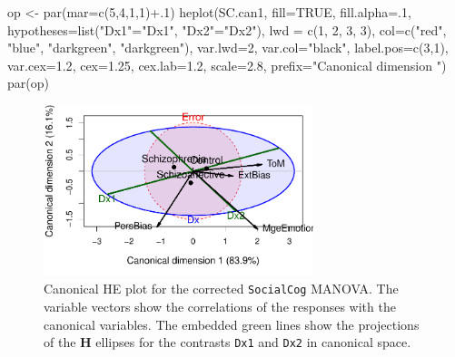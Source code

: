 \documentclass[
  letterpaper,
  10pt,
  krantz2]{krantz}
\makeatletter
\newenvironment{Shaded}{\begin{snugshade}}{\end{snugshade}}
\newcommand{\AttributeTok}[1]{\textcolor[rgb]{0.40,0.45,0.13}{#1}}
\newcommand{\ConstantTok}[1]{\textcolor[rgb]{0.56,0.35,0.01}{#1}}
\newcommand{\DecValTok}[1]{\textcolor[rgb]{0.68,0.00,0.00}{#1}}
\newcommand{\FloatTok}[1]{\textcolor[rgb]{0.68,0.00,0.00}{#1}}
\newcommand{\FunctionTok}[1]{\textcolor[rgb]{0.28,0.35,0.67}{#1}}
\newcommand{\NormalTok}[1]{\textcolor[rgb]{0.00,0.23,0.31}{#1}}
\newcommand{\OtherTok}[1]{\textcolor[rgb]{0.00,0.23,0.31}{#1}}
\newcommand{\SpecialCharTok}[1]{\textcolor[rgb]{0.37,0.37,0.37}{#1}}
\newcommand{\StringTok}[1]{\textcolor[rgb]{0.13,0.47,0.30}{#1}}
\newenvironment{kframe}{%
  \medskip{}
  \setlength{\fboxsep}{.8em}
  \def\at@end@of@kframe{}%
  \ifinner\ifhmode%
  \def\at@end@of@kframe{\end{minipage}}%
  \begin{minipage}{\columnwidth}%
  \fi\fi%
  \def\FrameCommand##1{\hskip\@totalleftmargin \hskip-\fboxsep
  \colorbox{shadecolor}{##1}\hskip-\fboxsep
      \hskip-\linewidth \hskip-\@totalleftmargin \hskip\columnwidth}%
  \MakeFramed {\advance\hsize-\width
    \@totalleftmargin\z@ \linewidth\hsize
    \@setminipage}}%
{\par\unskip\endMakeFramed%
  \at@end@of@kframe}
\renewenvironment{Shaded}{\begin{kframe}}{\end{kframe}}
\makeatother
\begin{document}
\begin{Shaded}
\begin{Highlighting}[]
\NormalTok{op }\OtherTok{\textless{}{-}} \FunctionTok{par}\NormalTok{(}\AttributeTok{mar=}\FunctionTok{c}\NormalTok{(}\DecValTok{5}\NormalTok{,}\DecValTok{4}\NormalTok{,}\DecValTok{1}\NormalTok{,}\DecValTok{1}\NormalTok{)}\SpecialCharTok{+}\NormalTok{.}\DecValTok{1}\NormalTok{)}
\FunctionTok{heplot}\NormalTok{(SC.can1, }
    \AttributeTok{fill=}\ConstantTok{TRUE}\NormalTok{, }\AttributeTok{fill.alpha=}\NormalTok{.}\DecValTok{1}\NormalTok{,}
    \AttributeTok{hypotheses=}\FunctionTok{list}\NormalTok{(}\StringTok{"Dx1"}\OtherTok{=}\StringTok{"Dx1"}\NormalTok{, }\StringTok{"Dx2"}\OtherTok{=}\StringTok{"Dx2"}\NormalTok{),}
    \AttributeTok{lwd =} \FunctionTok{c}\NormalTok{(}\DecValTok{1}\NormalTok{, }\DecValTok{2}\NormalTok{, }\DecValTok{3}\NormalTok{, }\DecValTok{3}\NormalTok{),}
    \AttributeTok{col=}\FunctionTok{c}\NormalTok{(}\StringTok{"red"}\NormalTok{, }\StringTok{"blue"}\NormalTok{, }\StringTok{"darkgreen"}\NormalTok{, }\StringTok{"darkgreen"}\NormalTok{),}
    \AttributeTok{var.lwd=}\DecValTok{2}\NormalTok{, }
    \AttributeTok{var.col=}\StringTok{"black"}\NormalTok{, }
    \AttributeTok{label.pos=}\FunctionTok{c}\NormalTok{(}\DecValTok{3}\NormalTok{,}\DecValTok{1}\NormalTok{), }
    \AttributeTok{var.cex=}\FloatTok{1.2}\NormalTok{, }
    \AttributeTok{cex=}\FloatTok{1.25}\NormalTok{, }\AttributeTok{cex.lab=}\FloatTok{1.2}\NormalTok{, }
    \AttributeTok{scale=}\FloatTok{2.8}\NormalTok{,}
    \AttributeTok{prefix=}\StringTok{"Canonical dimension "}\NormalTok{)}
\FunctionTok{par}\NormalTok{(op)}
\end{Highlighting}
\end{Shaded}

\begin{figure}[H]

{\centering \includegraphics[width=0.7\textwidth,height=\textheight]{figs/fig-SC1-hecan-1.pdf}

}

\caption{\label{fig-SC1-hecan}Canonical HE plot for the corrected
\texttt{SocialCog} MANOVA. The variable vectors show the correlations of
the responses with the canonical variables. The embedded green lines
show the projections of the \textbf{H} ellipses for the contrasts
\texttt{Dx1} and \texttt{Dx2} in canonical space.}

\end{figure}
\end{document}
